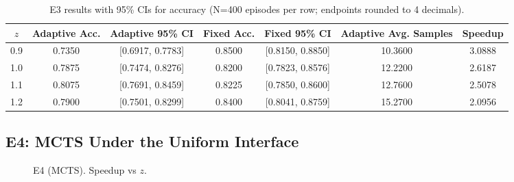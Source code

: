 \begin{table}[H]
  \centering
  \caption{E3 results with 95\% CIs for accuracy (N=400 episodes per row; endpoints rounded to 4 decimals).}
  \vspace{0.25em}
  \begin{adjustbox}{width=\linewidth}
  \begin{tabular}{c c c c c c c}
    \toprule
    $z$ & Adaptive Acc. & Adaptive 95\% CI & Fixed Acc. & Fixed 95\% CI & Adaptive Avg. Samples & Speedup \\
    \midrule
    0.9 & 0.7350 & [0.6917, 0.7783] & 0.8500 & [0.8150, 0.8850] & 10.3600 & 3.0888 \\
    1.0 & 0.7875 & [0.7474, 0.8276] & 0.8200 & [0.7823, 0.8576] & 12.2200 & 2.6187 \\
    1.1 & 0.8075 & [0.7691, 0.8459] & 0.8225 & [0.7850, 0.8600] & 12.7600 & 2.5078 \\
    1.2 & 0.7900 & [0.7501, 0.8299] & 0.8400 & [0.8041, 0.8759] & 15.2700 & 2.0956 \\
    \bottomrule
  \end{tabular}
  \end{adjustbox}
\end{table}

\subsection{E4: MCTS Under the Uniform Interface}
\begin{figure}[H]
  \centering
  \begin{adjustbox}{width=\linewidth}
  \end{adjustbox}
  \caption{E4 (MCTS). Speedup vs $z$.}
  \label{fig:e4a}
\end{figure}

